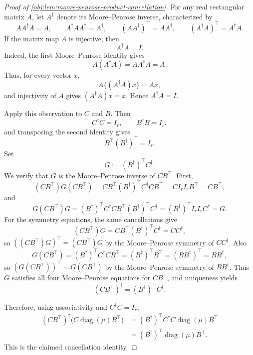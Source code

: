 \documentclass[11pt]{article}
\begin{document}
\begin{proof}[Proof of \cref{obj:lem:moore-penrose-product-cancellation}]
For any real rectangular matrix \(A\), let \(A^\dagger\) denote its Moore--Penrose inverse, characterized by
\[
AA^\dagger A=A,\qquad
A^\dagger A A^\dagger=A^\dagger,\qquad
(AA^\dagger)^\top=AA^\dagger,\qquad
(A^\dagger A)^\top=A^\dagger A .
\]
If the matrix map \(A\) is injective, then
\[
A^\dagger A=I .
\]
Indeed, the first Moore--Penrose identity gives
\[
A(A^\dagger A)=AA^\dagger A=A.
\]
Thus, for every vector \(x\),
\[
A\{(A^\dagger A)x\}=Ax,
\]
and injectivity of \(A\) gives \((A^\dagger A)x=x\). Hence \(A^\dagger A=I\). %

Apply this observation to \(C\) and \(B\). Then
\[
C^\dagger C=I_r,\qquad B^\dagger B=I_r,
\]
and transposing the second identity gives
\[
B^\top (B^\dagger)^\top=I_r . %
\]
Set
\[
G:=(B^\dagger)^\top C^\dagger .
\]
We verify that \(G\) is the Moore--Penrose inverse of \(CB^\top\). First,
\[
(CB^\top)G(CB^\top)
=
CB^\top (B^\dagger)^\top C^\dagger C B^\top
=
C I_r I_r B^\top
=
CB^\top ,
\]
and
\[
G(CB^\top)G
=
(B^\dagger)^\top C^\dagger C B^\top (B^\dagger)^\top C^\dagger
=
(B^\dagger)^\top I_r I_r C^\dagger
=
G . %
\]
For the symmetry equations, the same cancellations give
\[
(CB^\top)G=CB^\top(B^\dagger)^\top C^\dagger=CC^\dagger,
\]
so \(((CB^\top)G)^\top=(CB^\top)G\) by the Moore--Penrose symmetry of \(CC^\dagger\). Also
\[
G(CB^\top)=(B^\dagger)^\top C^\dagger C B^\top=(B^\dagger)^\top B^\top=(BB^\dagger)^\top=BB^\dagger,
\]
so \((G(CB^\top))^\top=G(CB^\top)\) by the Moore--Penrose symmetry of \(BB^\dagger\). Thus \(G\) satisfies all four Moore--Penrose equations for \(CB^\top\), and uniqueness yields
\[
(CB^\top)^\dagger=(B^\dagger)^\top C^\dagger . %
\]

Therefore, using associativity and \(C^\dagger C=I_r\),
\[
\begin{aligned}
(CB^\top)^\dagger\bigl(C\operatorname{diag}(\mu)B^\top\bigr)
&=(B^\dagger)^\top C^\dagger C\operatorname{diag}(\mu)B^\top \\
&=(B^\dagger)^\top \operatorname{diag}(\mu)B^\top .
\end{aligned}
\]
This is the claimed cancellation identity. %
\end{proof}
\end{document}
